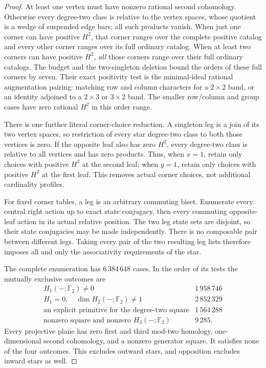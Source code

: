\begin{proof}
At least one vertex must have nonzero rational second
cohomology.  Otherwise every degree-two class is relative
to the vertex spaces, whose quotient is a wedge of suspended
edge bars; all such products vanish.  When just one corner
can have positive $H^2$, that corner ranges over the complete
positive catalog and every other corner ranges over its full
ordinary catalog.  When at least two corners can have
positive $H^2$, \emph{all} those corners range over their full
ordinary catalogs.  The budget and the two-singleton deletion
bound the orders of these full corners by seven.
Their exact positivity test is the minimal-ideal rational
augmentation pairing: matching row and column characters for
a $2\times2$ band, or an identity adjoined to a $2\times3$
or $3\times2$ band.  The smaller row/column and group cases
have zero rational $H^2$ in this order range.

There is one further literal corner-choice reduction.  A
singleton leg is a join of its two vertex spaces, so restriction
of every star degree-two class to both those vertices is zero.
If the opposite leaf also has zero $H^2$, every degree-two
class is relative to all vertices and has zero products.
Thus, when $x=1$, retain only choices with positive $H^2$ at
the second leaf; when $y=1$, retain only choices with positive
$H^2$ at the first leaf.  This removes actual corner choices,
not additional cardinality profiles.

For fixed corner tables, a leg is an arbitrary commuting
biset.  Enumerate every central right action up to exact
state conjugacy, then every commuting opposite-leaf action
in its actual relative position.  The two leg state sets
are disjoint, so their state conjugacies may be made
independently.  There is no composable pair between different
legs.  Taking every pair of the two resulting leg lists
therefore imposes all and only the associativity requirements
of the star.

The complete enumeration has $6\,384\,648$ cases.  In the
order of its tests the mutually exclusive outcomes are
\[
\begin{array}{l|r}
 H_1(-;\mathbb F_2)\ne0&1\,958\,746\\
 H_1=0,\quad\dim H_2(-;\mathbb F_2)\ne1&2\,852\,329\\
 \text{an explicit primitive for the degree-two square}&1\,564\,288\\
 \text{nonzero square and nonzero }H_3(-;\mathbb F_2)&9\,285.
\end{array}
\]
Every projective plane has zero first and third mod-two
homology, one-dimensional second cohomology, and a nonzero
generator square.  It satisfies none of the four outcomes.
This excludes outward stars, and opposition excludes inward
stars as well.
\end{proof}

